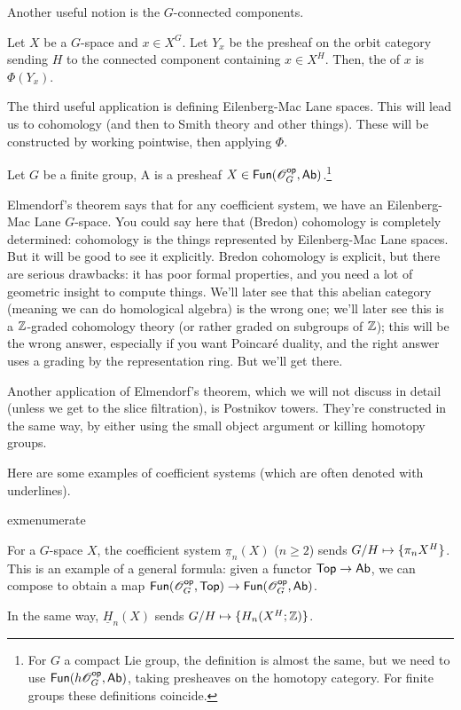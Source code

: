 Another useful notion is the $G$-connected components.
\begin{defn}
Let $X$ be a $G$-space and $x\in X^G$. Let $Y_x$ be the presheaf on the orbit category sending $H$ to the connected
component containing $x\in X^H$. Then, the  of $x$ is $\Phi(Y_x)$.
\end{defn}
The third useful application is defining Eilenberg-Mac Lane spaces. This will lead us to cohomology (and then to
Smith theory and other things). These will be constructed by working pointwise, then applying $\Phi$.
\begin{defn}
Let $G$ be a finite group, A  is a presheaf $X\in\mathsf{Fun}(\mathscr O_G^{\mathsf{op}}, \mathsf{Ab})$.\footnote{For $G$ a
compact Lie group, the definition is almost the same, but we need to use $\mathsf{Fun}(h\mathscr O_G^{\mathsf{op}}, \mathsf{Ab})$, taking presheaves
on the homotopy category. For finite groups these definitions coincide.}
\end{defn}
Elmendorf's theorem says that for any coefficient system, we have an Eilenberg-Mac Lane $G$-space. You could say
here that (Bredon) cohomology is completely determined: cohomology is the things represented by Eilenberg-Mac Lane
spaces. But it will be good to see it explicitly. Bredon cohomology is explicit, but there are serious drawbacks:
it has poor formal properties, and you need a lot of geometric insight to compute things. We'll later see that this
abelian category (meaning we can do homological algebra) is the wrong one; we'll later see this is a $\mathbb Z$-graded
cohomology theory (or rather graded on subgroups of $\mathbb Z$); this will be the wrong answer, especially if you want
Poincaré duality, and the right answer uses a grading by the representation ring. But we'll get there.
\begin{rem}
Another application of Elmendorf's theorem, which we will not discuss in detail (unless we get to the slice
filtration), is Postnikov towers. They're constructed in the same way, by either using the small object argument or
killing homotopy groups.
\end{rem}
Here are some examples of coefficient systems (which are often denoted with underlines).
\begin{comp}{exm}{enumerate}
	\item For a $G$-space $X$, the coefficient system $\underline\pi_n(X)$ ($n\ge 2$) sends $G/H\mapsto\set{\pi_nX^H}$. This is an example of
	a general formula: given a functor $\mathsf{Top}\to\mathsf{Ab}$, we can compose to obtain a map $\mathsf{Fun}(\mathscr O_G^{\mathsf{op}},
	\mathsf{Top})\to\mathsf{Fun}(\mathscr O_G^{\mathsf{op}}, \mathsf{Ab})$.
	\item In the same way, $\underline H_n(X)$ sends $G/H\mapsto\set{H_n(X^H;\Z)}$.\qedhere
\end{comp}
